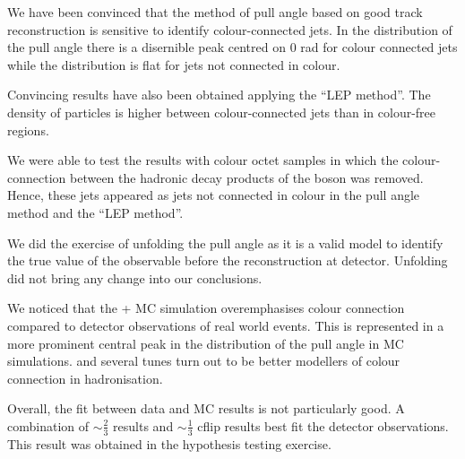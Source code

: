We have been convinced that the method of pull angle based on good track reconstruction is sensitive to identify colour-connected jets. In the distribution of the pull angle there is a disernible peak centred on 0 rad for colour connected jets while the distribution is flat for jets not connected in colour.

Convincing results have also been obtained applying the ``LEP method''. The density of particles is higher between colour-connected jets than in colour-free regions.

We were able to test the results with \PW colour octet samples in which the colour-connection between the hadronic decay products of the \PW boson was removed. Hence, these jets appeared as jets not connected in colour in the pull angle method and the ``LEP method''.

We did the exercise of unfolding the pull angle as it is a valid model to identify the true value of the observable before the reconstruction at detector. Unfolding did not bring any change into our conclusions.

We noticed that the \POWHEG + \PYTHIA MC simulation overemphasises colour connection compared to detector observations of real world events. This is represented in a more prominent central peak in the distribution of the pull angle in MC simulations. \HERWIGpp and several \PYTHIA tunes turn out to be better modellers of colour connection in hadronisation.

Overall, the fit between data and MC results is not particularly good. A combination of $\sim\frac{2}{3}$ \ttbar results and $\sim\frac{1}{3}$ \ttbar cflip results best fit the detector observations. This result was obtained in the hypothesis testing exercise.
